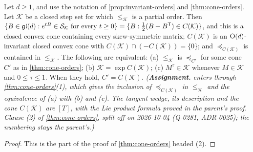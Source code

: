 \begin{lemma}
\label{lem:cone-orders-closed}
\leanok
Let $d \ge 1$, and use the notation of \ref{prop:invariant-orders} and \ref{thm:cone-orders}. Let
$\mathcal K$ be a closed step set for which $\le_{\mathcal K}$ is a partial order. Then
$\{B \in \mathfrak{gl}(d) : e^{tB} \in \mathcal S_{\mathcal K} \text{ for every } t \ge 0\} =
\{B : \tfrac12(B + B^{\mathsf{T}}) \in C(\mathcal K)\}$, and this is a closed convex cone containing every
skew-symmetric matrix; $C(\mathcal K)$ is an $\mathrm{O}(d)$-invariant closed convex cone with
$C(\mathcal K) \cap (-C(\mathcal K)) = \{0\}$; and $\preceq_{C(\mathcal K)}$ is contained in
$\le_{\mathcal K}$. The following are equivalent: (a) $\le_{\mathcal K}$ is $\preceq_{C'}$ for some cone
$C'$ as in \ref{thm:cone-orders}; (b) $\mathcal K = \exp C(\mathcal K)$; (c) $M^\tau \in \mathcal K$
whenever $M \in \mathcal K$ and $0 \le \tau \le 1$. When they hold, $C' = C(\mathcal K)$.
\statusA\quad{}\quad\emph{(\textbf{Assignment.}  enters through
\ref{thm:cone-orders}(1), which gives the inclusion of $\preceq_{C(\mathcal K)}$ in $\le_{\mathcal K}$ and
the equivalence of (a) with (b) and (c). The tangent wedge, its description and the cone $C(\mathcal K)$
are $[T]$, with the Lie product formula proved in the parent's proof. Clause (2) of
\ref{thm:cone-orders}, split off on 2026-10-04 (Q-0281, ADR-0025); the numbering stays the parent's.)}
\end{lemma}

\begin{proof}
\leanok
This is the part of the proof of \ref{thm:cone-orders} headed (2).
\end{proof}

